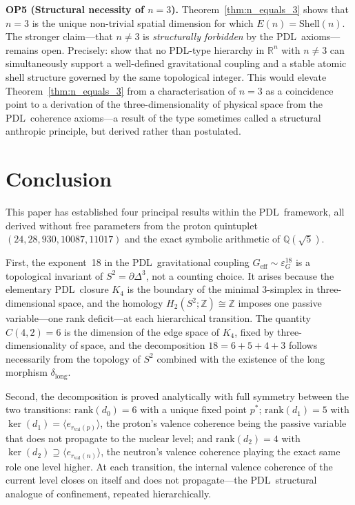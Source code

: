 \documentclass[11pt,a4paper]{article}
\theoremstyle{definition}
\newcommand{\PDL}{\textnormal{PDL}}
\newcommand{\rval}{r_{\mathrm{val}}}
\newcommand{\epsg}{\varepsilon_G}
\newcommand{\Kfour}{K_4}
\newcommand{\rank}{\mathrm{rank}}
\newcommand{\dmap}[1]{d_{#1}}
\newcommand{\dlong}{\delta_{\mathrm{long}}}
\newcommand{\Efun}{E}
\newcommand{\Shell}{\mathrm{Shell}}
\begin{document}
\medskip\noindent\textbf{OP5 (Structural necessity of $n=3$).} Theorem~\ref{thm:n_equals_3} shows that $n=3$ is the unique non-trivial spatial dimension for which $\Efun(n) = \Shell(n)$. The stronger claim---that $n \neq 3$ is \emph{structurally forbidden} by the \PDL\ axioms---remains open. Precisely: show that no \PDL-type hierarchy in $\mathbb{R}^n$ with $n \neq 3$ can simultaneously support a well-defined gravitational coupling and a stable atomic shell structure governed by the same topological integer. This would elevate Theorem~\ref{thm:n_equals_3} from a characterisation of $n=3$ as a coincidence point to a derivation of the three-dimensionality of physical space from the \PDL\ coherence axioms---a result of the type sometimes called a structural anthropic principle, but derived rather than postulated.

\section*{Conclusion}

This paper has established four principal results within the \PDL\ framework, all derived without free parameters from the proton quintuplet $(24, 28, 930, 10087, 11017)$ and the exact symbolic arithmetic of $\mathbb{Q}(\sqrt{5})$.

First, the exponent~18 in the \PDL\ gravitational coupling $G_{\mathrm{eff}} \sim \epsg^{18}$ is a topological invariant of $S^2 = \partial\Delta^3$, not a counting choice. It arises because the elementary \PDL\ closure $\Kfour$ is the boundary of the minimal $3$-simplex in three-dimensional space, and the homology $H_2(S^2;\mathbb{Z}) \cong \mathbb{Z}$ imposes one passive variable---one rank deficit---at each hierarchical transition. The quantity $C(4,2) = 6$ is the dimension of the edge space of $\Kfour$, fixed by three-dimensionality of space, and the decomposition $18 = 6+5+4+3$ follows necessarily from the topology of $S^2$ combined with the existence of the long morphism $\dlong$.

Second, the decomposition is proved analytically with full symmetry between the two transitions: $\rank(\dmap{0}) = 6$ with a unique fixed point $p^*$; $\rank(\dmap{1}) = 5$ with $\ker(\dmap{1}) = \langle e_{\rval(p)}\rangle$, the proton's valence coherence being the passive variable that does not propagate to the nuclear level; and $\rank(\dmap{2}) = 4$ with $\ker(\dmap{2}) \supseteq \langle e_{\rval(n)}\rangle$, the neutron's valence coherence playing the exact same role one level higher. At each transition, the internal valence coherence of the current level closes on itself and does not propagate---the \PDL\ structural analogue of confinement, repeated hierarchically.
\end{document}
